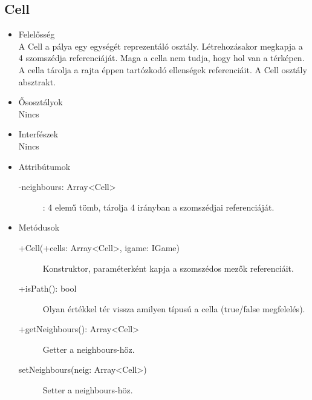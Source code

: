 \subsection{Cell}
\begin{itemize}
\item Felelősség\\
A Cell a pálya egy egységét reprezentáló osztály. Létrehozásakor megkapja a 4 szomszédja referenciáját. Maga a cella nem tudja, hogy hol van a térképen. A cella tárolja a rajta éppen tartózkodó ellenségek referenciáit. A Cell osztály absztrakt.
\item Ősosztályok\\
Nincs
\item Interfészek\\
Nincs
\item Attribútumok\\
	\begin{description}
		\item[-neighbours: Array<Cell>]: 4 elemű tömb, tárolja 4 irányban a szomszédjai referenciáját.  
		

		
	\end{description}
\item Metódusok\\
	\begin{description}
		
		\item[+Cell(+cells: Array<Cell>, igame: IGame)] Konstruktor, paraméterként kapja a szomszédos mezők referenciáit. 
		\item[+isPath(): bool] Olyan értékkel tér vissza amilyen típusú a cella (true/false megfelelés). 
		\item[+getNeighbours(): Array<Cell>] Getter a neighbours-höz.
		\item[setNeighbours(neig: Array<Cell>)] Setter a neighbours-höz.
		
		
	\end{description}
\end{itemize}
